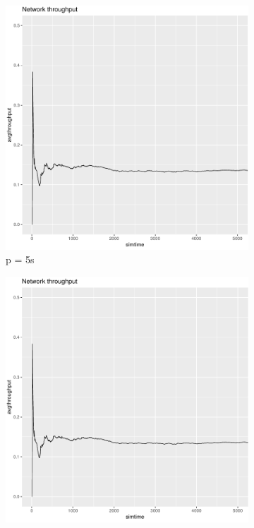 \documentclass[a4paper,11pt]{article}
\begin{document}
\begin{figure}[h!]
\begin{subfigure}{.5\textwidth}
  \centering
  \includegraphics[width=.9\linewidth]{images/chart-throughput-5.png}
  \caption{p = 5s}
  \label{fig:sfig1}
\end{subfigure}%
\begin{subfigure}{.5\textwidth}
  \centering
  \includegraphics[width=.9\linewidth]{images/chart-throughput-75.png}

\end{subfigure}
\end{figure}
\end{document}

